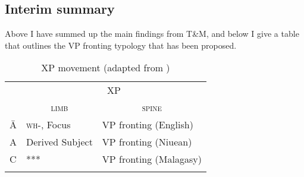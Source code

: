 \documentclass[output=paper,colorlinks,citecolor=brown,
]{langscibook}
\begin{document}
\subsection{Interim summary}

Above I have summed up the main findings from T\&M, and below I give a table that outlines the VP fronting typology that has been proposed.  

\begin{table}
\caption{XP movement (adapted from \citet{Travis:2021})}
\begin{tabular}{ l  l  l }
\lsptoprule
& \multicolumn{2}{c}{XP} \\\cmidrule(lr){2-3}
&\multicolumn{1}{c}{\textsc{limb}} & \multicolumn{1}{c}{\textsc{spine}}   \\\midrule
\=A &  \textsc{wh-}, Focus & VP fronting (English)   \\
A  & Derived Subject&  VP fronting (Niuean)    \\
C  & ***  &  VP fronting (Malagasy) \\
\lspbottomrule
\end{tabular}
\end{table}
\end{document}
